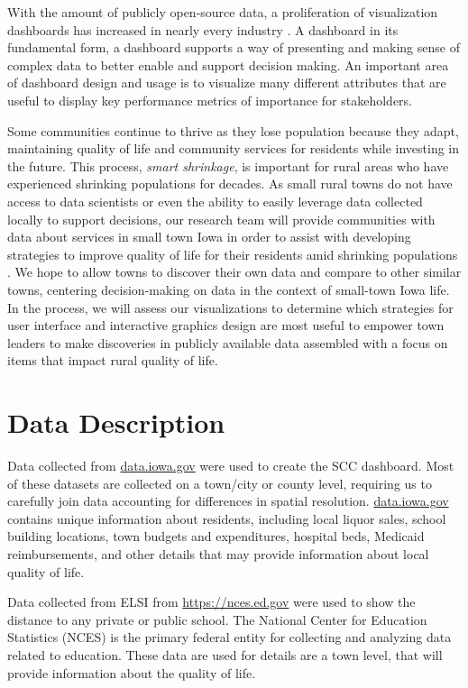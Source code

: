 \documentclass[letterpaper,inpress]{jdsart}
\begin{document}
With the amount of publicly open-source data, a proliferation of visualization dashboards has increased in nearly every industry \citet{fisher}.
A dashboard in its fundamental form, a dashboard supports a way of presenting and making sense of complex data to better enable and support decision making. An important area of dashboard design and usage is to visualize many different attributes that are useful to display key performance metrics of importance for stakeholders.

Some communities continue to thrive as they lose population because they adapt, maintaining quality of life and community services for residents while investing in the future.
This process, \emph{smart shrinkage}, is important for rural areas who have experienced shrinking populations for decades. As small rural towns do not have access to data scientists or even the ability to easily leverage data collected locally to support decisions, our research team will provide communities with data about services in small town Iowa in order to assist with developing strategies to improve quality of life for their residents amid shrinking populations \citet{scc}. We hope to allow towns to discover their own data and compare to other similar towns, centering decision-making on data in the context of small-town Iowa life. In the process, we will assess our visualizations to determine which strategies for user interface and interactive graphics design are most useful to empower town leaders to make discoveries in publicly available data assembled with a focus on items that impact rural quality of life.

\section{Data Description}

Data collected from \url{data.iowa.gov} were used to create the SCC dashboard. Most of these datasets are collected on a town/city or county level, requiring us to carefully join data accounting for differences in spatial resolution. \url{data.iowa.gov} contains unique information about residents, including local liquor sales, school building locations, town budgets and expenditures, hospital beds, Medicaid reimbursements, and other details that may provide information about local quality of life.

Data collected from ELSI from \url{https://nces.ed.gov} were used to show the distance to any private or public school. The National Center for Education Statistics (NCES) is the primary federal entity for collecting and analyzing data related to education. These data are used for details are a town level, that will provide information about the quality of life.
\end{document}
